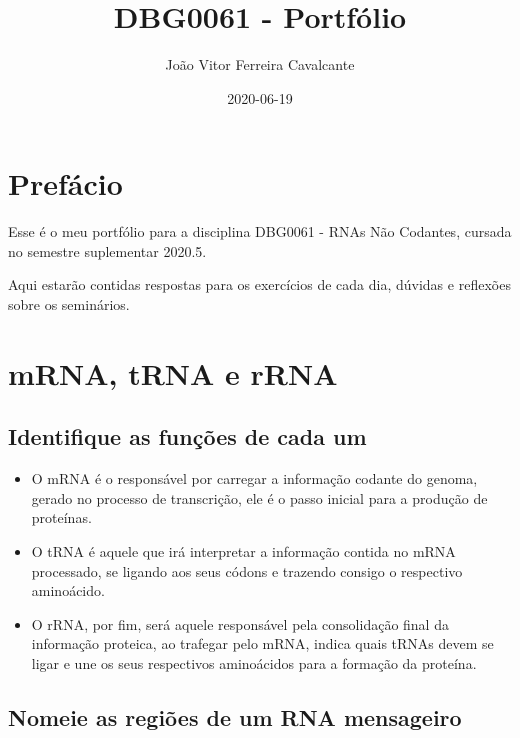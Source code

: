 \documentclass[
]{book}
\title{DBG0061 - Portfólio}
\author{João Vitor Ferreira Cavalcante}
\date{2020-06-19}
\begin{document}
\maketitle

{
\setcounter{tocdepth}{1}
\tableofcontents
}
\hypertarget{prefuxe1cio}{%
\chapter{Prefácio}\label{prefuxe1cio}}

Esse é o meu portfólio para a disciplina DBG0061 - RNAs Não Codantes, cursada no semestre suplementar 2020.5.

Aqui estarão contidas respostas para os exercícios de cada dia, dúvidas e reflexões sobre os seminários.

\hypertarget{aula1}{%
\chapter{mRNA, tRNA e rRNA}\label{aula1}}

\hypertarget{identifique-as-funuxe7uxf5es-de-cada-um}{%
\section{Identifique as funções de cada um}\label{identifique-as-funuxe7uxf5es-de-cada-um}}

\begin{itemize}
\item
  O mRNA é o responsável por carregar a informação codante do genoma, gerado no processo de transcrição,
  ele é o passo inicial para a produção de proteínas.
\item
  O tRNA é aquele que irá interpretar a informação contida no mRNA processado, se ligando aos seus códons e trazendo consigo o respectivo aminoácido.
\item
  O rRNA, por fim, será aquele responsável pela consolidação final da informação proteica, ao trafegar pelo mRNA, indica quais tRNAs devem se ligar e une os seus respectivos aminoácidos para a formação da proteína.
\end{itemize}

\hypertarget{regioes}{%
\section{Nomeie as regiões de um RNA mensageiro}\label{regioes}}
\end{document}
